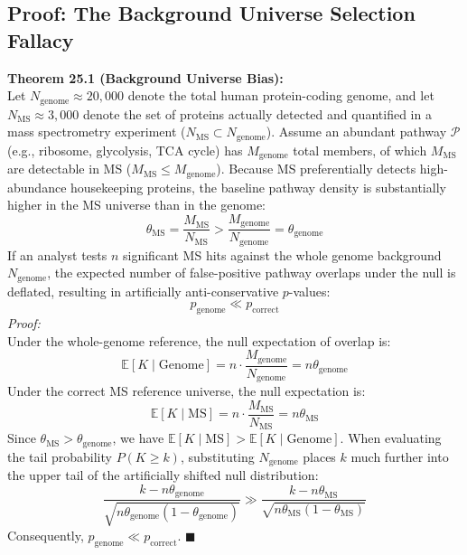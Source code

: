 \documentclass[11pt,oneside]{book}
\begin{document}
\subsection{Proof: The Background Universe Selection Fallacy}

\begin{svgraybox}
\textbf{Theorem 25.1 (Background Universe Bias):}\\
Let $N_{\text{genome}} \approx 20,000$ denote the total human protein-coding genome, and let $N_{\text{MS}} \approx 3,000$ denote the set of proteins actually detected and quantified in a mass spectrometry experiment ($N_{\text{MS}} \subset N_{\text{genome}}$). Assume an abundant pathway $\mathcal{P}$ (e.g., ribosome, glycolysis, TCA cycle) has $M_{\text{genome}}$ total members, of which $M_{\text{MS}}$ are detectable in MS ($M_{\text{MS}} \le M_{\text{genome}}$). Because MS preferentially detects high-abundance housekeeping proteins, the baseline pathway density is substantially higher in the MS universe than in the genome:
\begin{equation}
\theta_{\text{MS}} = \frac{M_{\text{MS}}}{N_{\text{MS}}} > \frac{M_{\text{genome}}}{N_{\text{genome}}} = \theta_{\text{genome}}
\end{equation}
If an analyst tests $n$ significant MS hits against the whole genome background $N_{\text{genome}}$, the expected number of false-positive pathway overlaps under the null is deflated, resulting in artificially anti-conservative $p$-values:
\begin{equation}
p_{\text{genome}} \ll p_{\text{correct}}
\end{equation}
\textit{Proof:}\\
Under the whole-genome reference, the null expectation of overlap is:
\begin{equation*}
\mathbb{E}[K \mid \text{Genome}] = n \cdot \frac{M_{\text{genome}}}{N_{\text{genome}}} = n \theta_{\text{genome}}
\end{equation*}
Under the correct MS reference universe, the null expectation is:
\begin{equation*}
\mathbb{E}[K \mid \text{MS}] = n \cdot \frac{M_{\text{MS}}}{N_{\text{MS}}} = n \theta_{\text{MS}}
\end{equation*}
Since $\theta_{\text{MS}} > \theta_{\text{genome}}$, we have $\mathbb{E}[K \mid \text{MS}] > \mathbb{E}[K \mid \text{Genome}]$. When evaluating the tail probability $P(K \ge k)$, substituting $N_{\text{genome}}$ places $k$ much further into the upper tail of the artificially shifted null distribution:
\begin{equation*}
\frac{k - n\theta_{\text{genome}}}{\sqrt{n \theta_{\text{genome}}(1 - \theta_{\text{genome}})}} \gg \frac{k - n\theta_{\text{MS}}}{\sqrt{n \theta_{\text{MS}}(1 - \theta_{\text{MS}})}}
\end{equation*}
Consequently, $p_{\text{genome}} \ll p_{\text{correct}}$. \hfill $\blacksquare$
\end{svgraybox}
\end{document}
